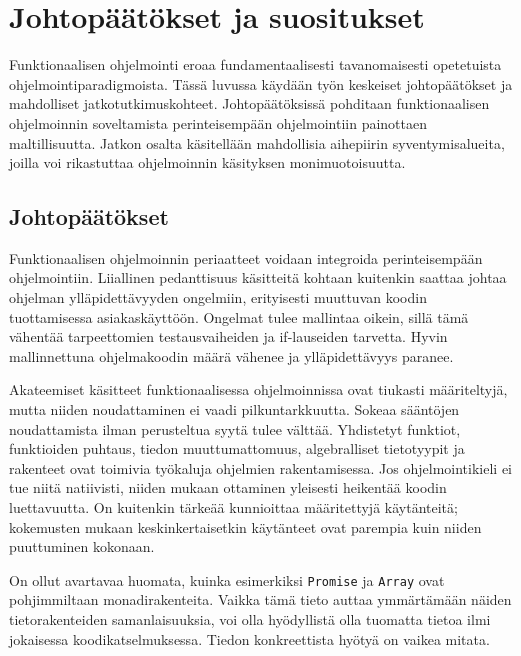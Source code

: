 \vspace{21.5pt}
\chapter{Johtopäätökset ja suositukset}

Funktionaalisen ohjelmointi eroaa fundamentaalisesti tavanomaisesti opetetuista ohjelmointiparadigmoista. Tässä luvussa käydään työn keskeiset johtopäätökset ja mahdolliset jatkotutkimuskohteet. Johtopäätöksissä pohditaan funktionaalisen ohjelmoinnin soveltamista perinteisempään ohjelmointiin painottaen maltillisuutta. Jatkon osalta käsitellään mahdollisia aihepiirin syventymisalueita, joilla voi rikastuttaa ohjelmoinnin käsityksen monimuotoisuutta.

\section{Johtopäätökset}

Funktionaalisen ohjelmoinnin periaatteet voidaan integroida perinteisempään ohjelmointiin. Liiallinen pedanttisuus käsitteitä kohtaan kuitenkin saattaa johtaa ohjelman ylläpidettävyyden ongelmiin, erityisesti muuttuvan koodin tuottamisessa asiakaskäyttöön. Ongelmat tulee mallintaa oikein, sillä tämä vähentää tarpeettomien testausvaiheiden ja if-lauseiden tarvetta. Hyvin mallinnettuna ohjelmakoodin määrä vähenee ja ylläpidettävyys paranee.

Akateemiset käsitteet funktionaalisessa ohjelmoinnissa ovat tiukasti määriteltyjä, mutta niiden noudattaminen ei vaadi pilkuntarkkuutta. Sokeaa sääntöjen noudattamista ilman perusteltua syytä tulee välttää. Yhdistetyt funktiot, funktioiden puhtaus, tiedon muuttumattomuus, algebralliset tietotyypit ja rakenteet ovat toimivia työkaluja ohjelmien rakentamisessa. Jos ohjelmointikieli ei tue niitä natiivisti, niiden mukaan ottaminen yleisesti heikentää koodin luettavuutta. On kuitenkin tärkeää kunnioittaa määritettyjä käytänteitä; kokemusten mukaan keskinkertaisetkin käytänteet ovat parempia kuin niiden puuttuminen kokonaan.

On ollut avartavaa huomata, kuinka esimerkiksi \texttt{Promise} ja \texttt{Array} ovat pohjimmiltaan monadirakenteita. Vaikka tämä tieto auttaa ymmärtämään näiden tietorakenteiden samanlaisuuksia, voi olla hyödyllistä olla tuomatta tietoa ilmi jokaisessa koodikatselmuksessa. Tiedon konkreettista hyötyä on vaikea mitata.

